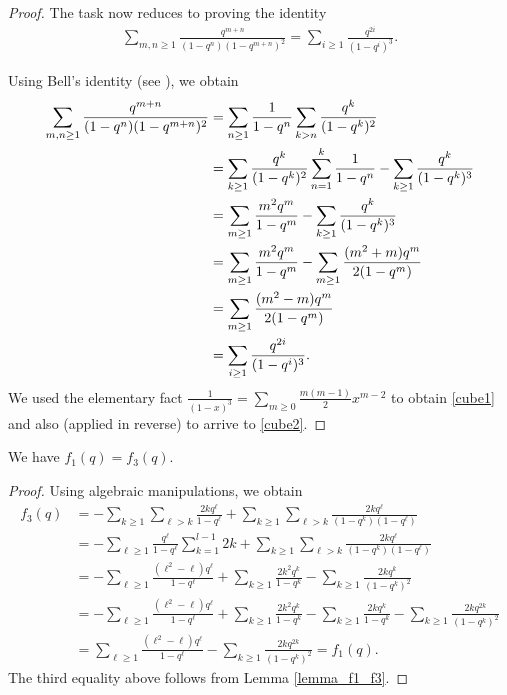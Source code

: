 \documentclass[a4paper,reqno,12pt]{amsart}
\begin{document}
\begin{proof}
\smallskip
\noindent
The task now reduces to proving the identity
\begin{align} \label{identity1}
\sum_{m,n\geq1} \frac{q^{m+n}}{(1-q^n)(1-q^{m+n})^2}= \sum_{i\geq1} \frac{q^{2i}}{(1-q^i)^3}.
\end{align}

\noindent
Using Bell's identity (see \cite[page 117]{Andrews}), we obtain
\begin{align}\notag
\sum_{m,n\geq1} \frac{q^{m+n}}{(1-q^n)(1-q^{m+n})^2}
&=\sum_{n\geq1}\frac1{1-q^n}\sum_{k>n}\frac{q^k}{(1-q^k)^2}  \\
\notag &= \sum_{k\geq1} \frac{q^k}{(1-q^k)^2}\sum_{n=1}^k \frac1{1-q^n} - \sum_{k\geq1} \frac{q^k}{(1-q^k)^3} \\ \notag
&= \sum_{m\geq1} \frac{m^2q^m}{1-q^m}  - \sum_{k\geq1} \frac{q^k}{(1-q^k)^3} \\ \label{cube1}
&= \sum_{m\geq1} \frac{m^2q^m}{1-q^m}  - \sum_{m\geq1} \frac{(m^2+m)q^m}{2(1-q^m)} \\ \notag
&=\sum_{m\geq1} \frac{(m^2-m)q^m}{2(1-q^m)}\\ \label{cube2} & = \sum_{i\geq1} \frac{q^{2i}}{(1-q^i)^3}.
\end{align}
We used the elementary fact $\frac1{(1-x)^3}=\sum_{m\geq0}\frac{m(m-1)}2x^{m-2}$ to obtain \eqref{cube1} and also (applied in reverse) to arrive to \eqref{cube2}.
\end{proof}

\begin{theorem} \label{Th-f1-f3} We have $f_1(q)=f_3(q)$.
\end{theorem}
\begin{proof} 
Using algebraic manipulations, we obtain
\begin{align*} f_3(q) & = - \sum_{k\geq1}\sum_{\ell>k} \frac{2k q^{\ell}}{1-q^{\ell}} + \sum_{k\geq1}\sum_{\ell>k} \frac{2k q^{\ell}}{(1-q^k)(1-q^{\ell})}   \\
&= - \sum_{\ell\geq1} \frac{q^{\ell}}{1-q^{\ell}} \sum_{k=1}^{l-1} 2k + { \sum_{k\geq1}\sum_{\ell>k} \frac{2k q^{\ell}}{(1-q^k)(1-q^{\ell})} }   \\
&= - \sum_{\ell\geq1} \frac{(\ell^2-\ell)q^{\ell}}{1-q^{\ell}} + {\sum_{k\geq1} \frac{2k^2 q^k}{1-q^k} - \sum_{k\geq1} \frac{2kq^k}{(1-q^k)^2} } \\
&=  - \sum_{\ell\geq1} \frac{(\ell^2-\ell)q^{\ell}}{1-q^{\ell}} + \sum_{k\geq1} \frac{2k^2 q^k}{1-q^k} - \sum_{k\geq1} \frac{2kq^k}{1-q^k}  
-  \sum_{k\geq1} \frac{2kq^{2k}}{(1-q^k)^2}   \\
&= \sum_{\ell\geq1} \frac{(\ell^2-\ell)q^{\ell}}{1-q^{\ell}}  -  \sum_{k\geq1} \frac{2kq^{2k}}{(1-q^k)^2} =f_1(q).
\end{align*}
The third equality above follows from Lemma \ref{lemma_f1_f3}.
\end{proof}
\end{document}
